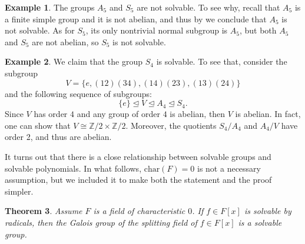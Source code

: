 \documentclass[12pt]{report}
\newtheorem{theorem}{Theorem}[chapter]
\numberwithin{equation}{section}
\numberwithin{theorem}{chapter}
\theoremstyle{definition}
\newtheorem{example}[theorem]{Example}
\newtheorem*{basic properties}{Basic Properties}
\newtheorem*{Important Remark}{Important Remark}
\def\nsg{\unlhd}
\begin{document}
\begin{example}
The groups $A_5$ and $S_5$ are not solvable. To see why, recall that $A_5$ is a finite simple group and it is not abelian, and thus by  we conclude that $A_5$ is not solvable. As for $S_5$, its only nontrivial normal subgroup is $A_5$, but both $A_5$ and $S_5$ are not abelian, so $S_5$ is not solvable.
\end{example}


\begin{example}
We claim that the group $S_4$ is solvable. To see that, consider the subgroup
$$V=\{e,(12)(34),(14)(23),(13)(24)\}$$
and the following sequence of subgroups:
$$\{e\}\nsg V\nsg A_4\nsg S_4.$$
Since $V$ has order $4$ and any group of order $4$ is abelian, then $V$ is abelian. In fact, one can show that $V \cong \mathbb{Z}/2 \times \mathbb{Z}/2$. Moreover, the quotients $S_4/A_4$ and $A_4/V$ have order 2, and thus are abelian.
\end{example}



It turns out that there is a close relationship between solvable groups and solvable polynomials. In what follows, $\mathrm{char}(F) = 0$ is not a necessary assumption, but we included it to make both the statement and the proof simpler.

\begin{theorem}\label{solvable by radicals implies solvable}
Assume $F$ is a field of characteristic $0$. If $f \in F[x]$ is solvable by radicals, then the Galois group of the splitting field of $f \in F[x]$ is a solvable group.
\end{theorem}
\end{document}
